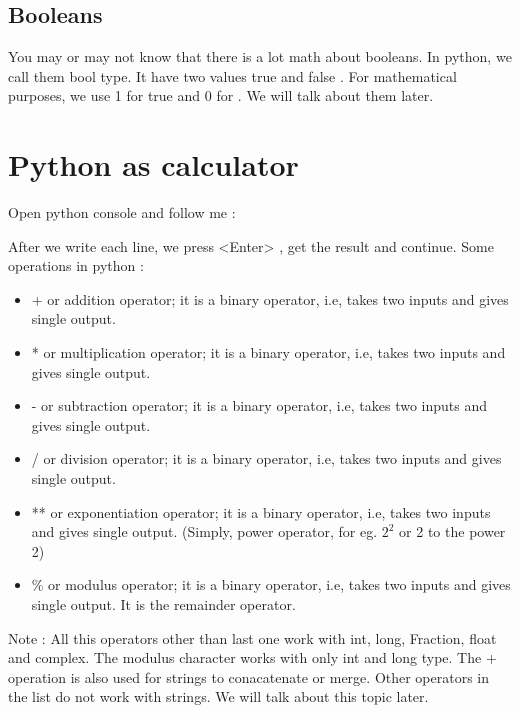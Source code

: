 \subsection{Booleans}

You may or may not know that there is a lot math about booleans. In python, we call them {\color{cyan} bool} type. It have two values {\color{cyan} true} and {\color{cyan} false} . For mathematical purposes, we use 1 for {\color{cyan} true} and 0 for {\color{cyan}}.
We will talk about them later.

\section{Python as calculator}

Open python console and follow me :


After we write each line, we press {\color{magenta} <Enter>} , get the result and continue.
Some operations in python :

\begin{itemize}
\item + or addition operator; it is a binary operator, i.e, takes two inputs and gives single output.
\item * or multiplication operator; it is a binary operator, i.e, takes two inputs and gives single output.
\item - or subtraction operator; it is a binary operator, i.e, takes two inputs and gives single output.
\item / or division operator; it is a binary operator, i.e, takes two inputs and gives single output.
\item ** or exponentiation operator; it is a binary operator, i.e, takes two inputs and gives single output. (Simply, power operator, for eg. $2^2$ or 2 to the power 2)
\item \% or modulus operator; it is a binary operator, i.e, takes two inputs and gives single output. It is the remainder operator.
\end{itemize}

Note : All this operators other than last one work with {\color{cyan} int}, {\color{cyan} long}, {\color{cyan} Fraction}, {\color{cyan} float} and {\color{cyan} complex}. The modulus character works with only {\color{cyan} int} and {\color{cyan} long} type. The + operation is also used for strings to conacatenate or merge. Other operators in the list do not work with strings. We will talk about this topic later.

